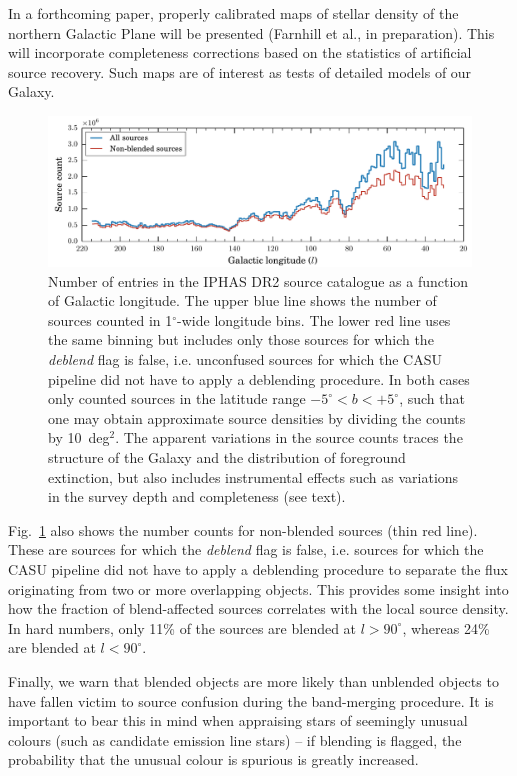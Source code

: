 \documentclass[useAMS,usenatbib]{mn2e}
\def\deg{$^{\circ}$}
\begin{document}
In a forthcoming paper, properly calibrated maps of stellar density
of the northern Galactic Plane will be presented (Farnhill
et al., in preparation).  This will incorporate completeness
corrections based on the statistics of artificial source
recovery.  Such maps are of interest as tests of detailed models of 
our Galaxy.

\begin{figure}
    \includegraphics[width=\textwidth]{figures/sourcecount/sourcecount.pdf} 
    \caption{Number of entries in the IPHAS DR2 source catalogue
    as a function of Galactic longitude.
    The upper blue line shows the number of sources
    counted in 1\deg-wide longitude bins.
    The lower red line uses the same binning
    but includes only those sources 
    for which the \emph{deblend} flag is {\sc false}, 
    i.e. unconfused sources for which the CASU pipeline
    did not have to apply a deblending procedure.
    In both cases only counted sources
    in the latitude range $-5^\circ<b<+5^\circ$,
    such that one may obtain approximate source densities
    by dividing the counts by 10~deg$^2$.
    The apparent variations in the source counts
    traces the structure of the Galaxy
    and the distribution of foreground extinction,
    but also includes instrumental effects
	such as variations in the survey depth
	and completeness (see text).
   }
    \label{fig:sourcecount}
\end{figure}

Fig.~\ref{fig:sourcecount} also shows the number counts
for non-blended sources (thin red line).
These are sources for which the \emph{deblend} flag is {\sc false},
i.e. sources for which the CASU pipeline did not have to apply 
a deblending procedure to separate the flux
originating from two or more overlapping objects.
This provides some insight into how the fraction of 
blend-affected sources correlates with the local source 
density.  In hard numbers, only 11\% of the sources are blended
at $l>90^\circ$, whereas 24\% are blended at $l<90^\circ$.

Finally, we warn that blended objects
are more likely than unblended objects to have fallen victim
to source confusion during the band-merging procedure.  It is
important to bear this in mind when appraising stars of seemingly
unusual colours (such as candidate emission line stars) -- if 
blending is flagged, the probability that the unusual colour is 
spurious is greatly increased.
\end{document}
